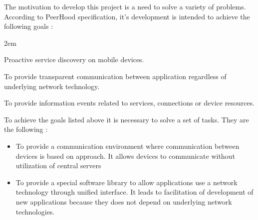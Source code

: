 %
The motivation to develop this project is a need to solve a variety of problems. 
%
According to PeerHood specification, it's development is intended to achieve the following goals : 
\begin{description}
	\leftskip2em%
	\setlength{\itemsep}{0pt}%
	\setlength{\parsep}{0pt}%
	
	\item[Proactivity] Proactive service discovery on mobile devices.
	
	\item[Connectivity] To provide transparent communication between application regardless of underlying network technology. 
	
	\item[Reactivity] To provide information events related to services, connections or device resources. 
\end{description}

%
To achieve the goals listed above it is necessary to solve a set of tasks. 
%
They are the following : 
%
\begin{itemize}
	
	\item To provide a communication environment where communication between devices is based on  approach. 
	It allows devices to communicate without utilization of central servers
	
	\item To provide a special software library to allow applications use a network technology through unified interface. 
	It leads to facilitation of development of new applications because they does not depend on underlying network technologies. 
\end{itemize}

